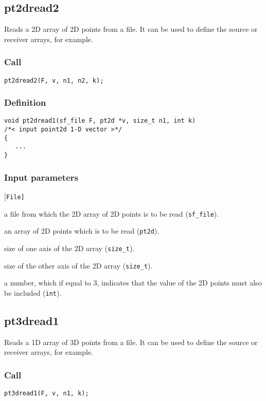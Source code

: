 \subsection{{pt2dread2}}
Reads a 2D array of 2D points from a file. It can be used to define the source or receiver arrays, for example.

\subsubsection*{Call}
\begin{verbatim}pt2dread2(F, v, n1, n2, k);\end{verbatim}

\subsubsection*{Definition}
\begin{verbatim}
void pt2dread1(sf_file F, pt2d *v, size_t n1, int k)
/*< input point2d 1-D vector >*/
{
   ...
}
\end{verbatim}   

\subsubsection*{Input parameters}
\begin{desclist}{\tt }{\quad}[\tt File]
   \setlength\itemsep{0pt}
   \item[File] a file from which the 2D array of 2D points is to be read (\texttt{sf\_file}). 
   \item[v]    an array of 2D points which is to be read (\texttt{pt2d}). 
   \item[n1]   size of one axis of the 2D array (\texttt{size\_t}).
   \item[n2]   size of the other axis of the 2D array (\texttt{size\_t}). 
   \item[k]    a number, which if equal to 3, indicates that the value of the 2D points must also be included (\texttt{int}).     
\end{desclist}




\subsection{{pt3dread1}}
Reads a 1D array of 3D points from a file. It can be used to define the source or receiver arrays, for example.

\subsubsection*{Call}
\begin{verbatim}pt3dread1(F, v, n1, k);\end{verbatim}

